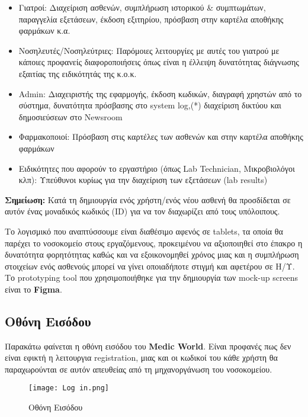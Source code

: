 \documentclass{article}
\begin{document}
\begin{itemize}
  \item Γιατροί: Διαχείριση ασθενών, συμπλήρωση ιστορικού \& συμπτωμάτων, παραγγελία εξετάσεων, έκδοση εξιτηρίου, πρόσβαση στην καρτέλα αποθήκης φαρμάκων κ.α.
  \item Νοσηλευτές/Νοσηλεύτριες: Παρόμοιες λειτουργίες με αυτές του γιατρού με κάποιες προφανείς διαφοροποιήσεις όπως είναι η έλλειψη δυνατότητας διάγνωσης εξαιτίας της ειδικότητάς της κ.ο.κ.
  \item Admin: Διαχειριστής της εφαρμογής, έκδοση κωδικών, διαγραφή χρηστών από το σύστημα, δυνατότητα πρόσβασης στο system log,(*) διαχείριση δικτύου και δημοσιεύσεων στο Newsroom
  \item Φαρμακοποιοί: Πρόσβαση στις καρτέλες των ασθενών και στην καρτέλα αποθήκης φαρμάκων
  \item Ειδικότητες που αφορούν το εργαστήριο (όπως Lab Technician, Μικροβιολόγοι κλπ): Υπεύθυνοι κυρίως για την διαχείριση των εξετάσεων (lab results)
\end{itemize}

\textbf{Σημείωση:} Κατά τη δημιουργία ενός χρήστη/ενός νέου ασθενή θα προσδίδεται σε αυτόν ένας μοναδικός κωδικός (ID) για να τον διαχωρίζει από τους υπόλοιπους. \vspace{0.3cm}

Το λογισμικό που αναπτύσσουμε είναι διαθέσιμο αφενός σε tablets, τα οποία θα παρέχει το νοσοκομείο στους εργαζόμενους, προκειμένου να αξιοποιηθεί στο έπακρο η δυνατότητα φορητότητας καθώς και να εξοικονομηθεί χρόνος μιας και η συμπλήρωση στοιχείων ενός ασθενούς μπορεί να γίνει οποιαδήποτε στιγμή και αφετέρου σε Η/Υ. Το prototyping tool που χρησιμοποιήθηκε για την δημιουργία των mock-up screens είναι το \textbf{Figma}.

\subsection{Οθόνη Εισόδου}

Παρακάτω φαίνεται η οθόνη εισόδου του \textbf{Medic World}. Είναι προφανές πως δεν είναι εφικτή η λειτουργια registration, μιας και οι κωδικοί του κάθε χρήστη θα παραχωρούνται σε αυτόν απευθείας από τη μηχανοργάνωση του νοσοκομείου.

\begin{figure}[!htb]
\centering
\texttt{[image: Log in.png]}
\caption{\label{fig:log in page} Οθόνη Εισόδου}
\end{figure}
\end{document}
